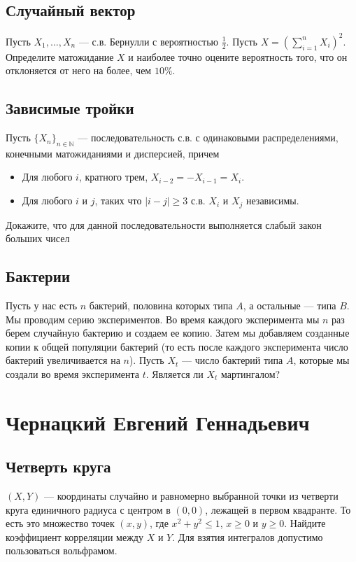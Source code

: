 \documentclass[12pt]{article}
\newcommand\N{\mathbb{N}}
\begin{document}
\subsection{Случайный вектор}

Пусть $X_1, \dots, X_n$ --- с.в. Бернулли с вероятностью $\frac{1}{2}$. Пусть $X = (\sum_{i = 1}^n X_i)^2$. Определите матожидание $X$ и наиболее точно оцените вероятность того, что он отклоняется от него на более, чем $10\%$.


\subsection{Зависимые тройки}
Пусть $\{X_n\}_{n \in \N}$ --- последовательность с.в. с одинаковыми распределениями, конечными матожиданиями и дисперсией, причем
\begin{itemize}
    \item Для любого $i$, кратного трем, $X_{i - 2} = - X_{i - 1} = X_{i}$. 
    \item Для любого $i$ и $j$, таких что $|i - j| \ge 3$ с.в. $X_i$ и $X_j$ независимы.
\end{itemize}
Докажите, что для данной последовательности выполняется слабый закон больших чисел


\subsection{Бактерии}

Пусть у нас есть $n$ бактерий, половина которых типа $A$, а остальные --- типа $B$. Мы проводим серию экспериментов. Во время каждого эксперимента мы $n$ раз берем случайную бактерию и создаем ее копию. Затем мы добавляем созданные копии к общей популяции бактерий (то есть после каждого эксперимента число бактерий увеличивается на $n$). Пусть $X_t$ --- число бактерий типа $A$, которые мы создали во время эксперимента $t$. Является ли $X_t$ мартингалом?


\newpage
\section{Чернацкий Евгений Геннадьевич}

\subsection{Четверть круга}

$(X, Y)$ --- координаты случайно и равномерно выбранной точки из четверти круга единичного радиуса с центром в $(0, 0)$, лежащей в первом квадранте. То есть это множество точек $(x, y)$, где $x^2 + y^2 \le 1$, $x \ge 0$ и $y \ge 0$. Найдите коэффициент корреляции между $X$ и $Y$. Для взятия интегралов  допустимо пользоваться вольфрамом.
\end{document}

